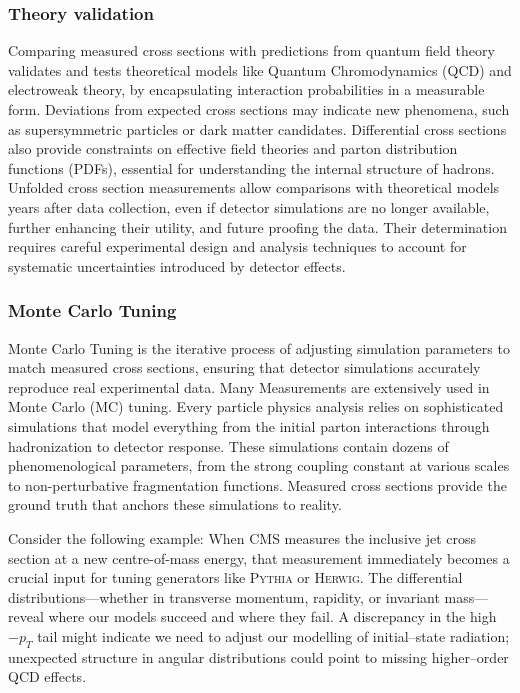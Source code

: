 \begin{definition}
        \subsubsection{Theory validation}
            Comparing measured cross sections with predictions from quantum field theory validates and tests theoretical models like Quantum Chromodynamics (QCD) and electroweak theory, by encapsulating interaction probabilities in a measurable form.
            Deviations from expected cross sections may indicate new phenomena, such as supersymmetric particles or dark matter candidates.
            Differential cross sections also provide constraints on effective field theories and parton distribution functions (PDFs), essential for understanding the internal structure of hadrons.
            Unfolded cross section measurements allow comparisons with theoretical models years after data collection, even if detector simulations are no longer available, further enhancing their utility, and future proofing the data.
            Their determination requires careful experimental design and analysis techniques to account for systematic uncertainties introduced by detector effects.

        \subsubsection{Monte Carlo Tuning}
            Monte Carlo Tuning is the iterative process of adjusting simulation parameters to match measured cross sections, ensuring that detector simulations accurately reproduce real experimental data.
            Many Measurements are extensively used in Monte Carlo (MC) tuning.
            Every particle physics analysis relies on sophisticated simulations that model everything from the initial parton interactions through hadronization to detector response.
            These simulations contain dozens of phenomenological parameters, from the strong coupling constant at various scales to non-perturbative fragmentation functions.
            Measured cross sections provide the ground truth that anchors these simulations to reality.

            Consider the following example:
            When CMS measures the inclusive jet cross section at a new centre-of-mass energy, that measurement immediately becomes a crucial input for tuning generators like \textsc{Pythia} or \textsc{Herwig}.
            The differential distributions---whether in transverse momentum, rapidity, or invariant mass---reveal where our models succeed and where they fail.
            A discrepancy in the high\(-p_T\) tail might indicate we need to adjust our modelling of initial--state radiation; unexpected structure in angular distributions could point to missing higher--order QCD effects.

\end{definition}

